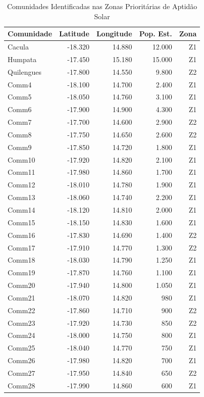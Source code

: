 \documentclass[12pt, a4paper]{article}
\begin{document}
\begin{table}[H]
\centering
\caption{Comunidades Identificadas nas Zonas Prioritárias de Aptidão Solar}
\label{Tab:11}
\footnotesize
\begin{tabular}{|l|r|r|r|r|}
\hline
\textbf{Comunidade} & \textbf{Latitude} & \textbf{Longitude} & \textbf{Pop. Est.} & \textbf{Zona} \\
\hline
Cacula & -18.320 & 14.880 & 12.000 & Z1 \\
Humpata & -17.450 & 15.180 & 15.000 & Z1 \\
Quilengues & -17.800 & 14.550 & 9.800 & Z2 \\
Comm4 & -18.100 & 14.700 & 2.400 & Z1 \\
Comm5 & -18.050 & 14.760 & 3.100 & Z1 \\
Comm6 & -17.900 & 14.900 & 4.300 & Z1 \\
Comm7 & -17.700 & 14.600 & 2.900 & Z2 \\
Comm8 & -17.750 & 14.650 & 2.600 & Z2 \\
Comm9 & -17.850 & 14.720 & 1.800 & Z1 \\
Comm10 & -17.920 & 14.820 & 2.100 & Z1 \\
Comm11 & -17.980 & 14.860 & 1.700 & Z1 \\
Comm12 & -18.010 & 14.780 & 1.900 & Z1 \\
Comm13 & -18.060 & 14.740 & 2.200 & Z1 \\
Comm14 & -18.120 & 14.810 & 2.000 & Z1 \\
Comm15 & -18.150 & 14.830 & 1.600 & Z1 \\
Comm16 & -17.830 & 14.690 & 1.400 & Z2 \\
Comm17 & -17.910 & 14.770 & 1.300 & Z2 \\
Comm18 & -18.030 & 14.790 & 1.250 & Z1 \\
Comm19 & -17.870 & 14.760 & 1.100 & Z1 \\
Comm20 & -17.940 & 14.800 & 1.050 & Z1 \\
Comm21 & -18.070 & 14.820 & 980 & Z1 \\
Comm22 & -17.860 & 14.710 & 900 & Z2 \\
Comm23 & -17.920 & 14.730 & 850 & Z2 \\
Comm24 & -18.000 & 14.750 & 800 & Z1 \\
Comm25 & -18.040 & 14.770 & 750 & Z1 \\
Comm26 & -17.980 & 14.820 & 700 & Z1 \\
Comm27 & -17.950 & 14.840 & 650 & Z2 \\
Comm28 & -17.990 & 14.860 & 600 & Z1 \\

\end{tabular}
\end{table}
\end{document}
